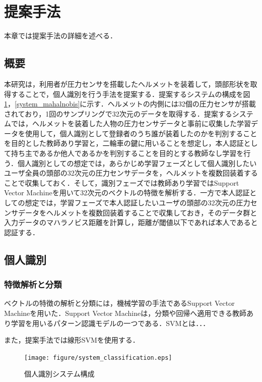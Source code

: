 \documentclass[Japanese,noauthor]{dicomopapers}
\begin{document}
\section{提案手法}
\label{method}
本章では提案手法の詳細を述べる．

\subsection{概要}
本研究は，利用者が圧力センサを搭載したヘルメットを装着して，頭部形状を取得することで，個人識別を行う手法を提案する．提案するシステムの構成を図\ref{system_classification}，\ref{system_mahalnobis}に示す．ヘルメットの内側には32個の圧力センサが搭載されており，1回のサンプリングで32次元のデータを取得する．提案するシステムでは，ヘルメットを装着した人物の圧力センサデータと事前に収集した学習データを使用して，個人識別として登録者のうち誰が装着したのかを判別することを目的とした教師あり学習と，二輪車の鍵に用いることを想定し，本人認証として持ち主であるか他人であるかを判別することを目的とする教師なし学習を行う．個人識別としての想定では，あらかじめ学習フェーズとして個人識別したいユーザ全員の頭部の32次元の圧力センサデータを，ヘルメットを複数回装着することで収集しておく．そして，識別フェーズでは教師あり学習ではSupport Vector Machineを用いて32次元のベクトルの特徴を解析する．一方で本人認証としての想定では，学習フェーズで本人認証したいユーザの頭部の32次元の圧力センサデータをヘルメットを複数回装着することで収集しておき，そのデータ群と入力データのマハラノビス距離を計算し，距離が閾値以下であれば本人であると認証する．

\subsection{個人識別}
\subsubsection{特徴解析と分類}
ベクトルの特徴の解析と分類には，機械学習の手法であるSupport Vector Machineを用いた．Support Vector Machineは，分類や回帰へ適用できる教師あり学習を用いるパターン認識モデルの一つである．SVMとは．．．


また，提案手法では線形SVMを使用する．

\begin{figure}[!t]
  \centering
    \texttt{[image: figure/system\_classification.eps]}
  \caption{個人識別システム構成}
  \label{system_classification}
\end{figure}
\end{document}
